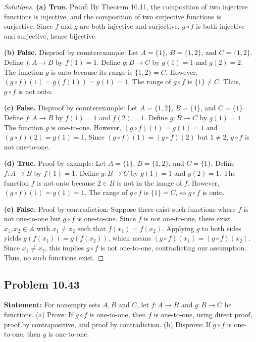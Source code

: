\documentclass[11pt, a4paper]{article}
\theoremstyle{definition}
\theoremstyle{remark}
\begin{document}
\begin{proof}[Solutions]
\textbf{(a) True.} Proof: By Theorem 10.11, the composition of two injective functions is injective, and the composition of two surjective functions is surjective. Since $f$ and $g$ are both injective and surjective, $g \circ f$ is both injective and surjective, hence bijective.

\textbf{(b) False.} Disproof by counterexample: Let $A = \{1\}$, $B = \{1, 2\}$, and $C = \{1, 2\}$. Define $f: A \to B$ by $f(1) = 1$. Define $g: B \to C$ by $g(1) = 1$ and $g(2) = 2$. The function $g$ is onto because its range is $\{1, 2\} = C$. However, $(g \circ f)(1) = g(f(1)) = g(1) = 1$. The range of $g \circ f$ is $\{1\} \neq C$. Thus, $g \circ f$ is not onto.

\textbf{(c) False.} Disproof by counterexample: Let $A = \{1, 2\}$, $B = \{1\}$, and $C = \{1\}$. Define $f: A \to B$ by $f(1) = 1$ and $f(2) = 1$. Define $g: B \to C$ by $g(1) = 1$. The function $g$ is one-to-one. However, $(g \circ f)(1) = g(1) = 1$ and $(g \circ f)(2) = g(1) = 1$. Since $(g \circ f)(1) = (g \circ f)(2)$ but $1 \neq 2$, $g \circ f$ is not one-to-one.

\textbf{(d) True.} Proof by example: Let $A = \{1\}$, $B = \{1, 2\}$, and $C = \{1\}$. Define $f: A \to B$ by $f(1) = 1$. Define $g: B \to C$ by $g(1) = 1$ and $g(2) = 1$. The function $f$ is not onto because $2 \in B$ is not in the image of $f$. However, $(g \circ f)(1) = g(1) = 1$. The range of $g \circ f$ is $\{1\} = C$, so $g \circ f$ is onto.

\textbf{(e) False.} Proof by contradiction: Suppose there exist such functions where $f$ is not one-to-one but $g \circ f$ is one-to-one. Since $f$ is not one-to-one, there exist $x_1, x_2 \in A$ with $x_1 \neq x_2$ such that $f(x_1) = f(x_2)$. Applying $g$ to both sides yields $g(f(x_1)) = g(f(x_2))$, which means $(g \circ f)(x_1) = (g \circ f)(x_2)$. Since $x_1 \neq x_2$, this implies $g \circ f$ is not one-to-one, contradicting our assumption. Thus, no such functions exist.
\end{proof}

\subsection*{Problem 10.43}
\textbf{Statement:} For nonempty sets $A, B$ and $C$, let $f: A \to B$ and $g: B \to C$ be functions.
(a) Prove: If $g \circ f$ is one-to-one, then $f$ is one-to-one, using direct proof, proof by contrapositive, and proof by contradiction.
(b) Disprove: If $g \circ f$ is one-to-one, then $g$ is one-to-one.
\end{document}

